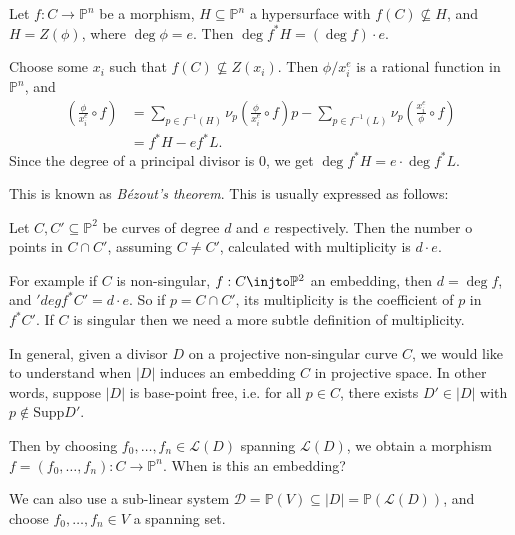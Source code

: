 \documentclass[12pt]{article}
\begin{document}
\begin{theorem}
	Let $f : C \to \mathbb{P}^n$ be a morphism, $H \subseteq \mathbb{P}^n$ a hypersurface with $f(C) \not \subseteq H$, and $H = Z(\phi)$, where $\deg \phi = e$. Then $\deg f^\ast H = (\deg f) \cdot e$.
\end{theorem}

\begin{proofbox}
	Choose some $x_i$ such that $f(C) \not \subseteq Z(x_i)$. Then $\phi/x_i^e$ is a rational function in $\mathbb{P}^n$, and
	\begin{align*}
		\left( \frac{\phi}{x_i^e} \circ f\right) &= \sum_{p \in f^{-1}(H)} \nu_p \left( \frac{\phi}{x_i^e} \circ f \right) p - \sum_{ p \in f^{-1}(L)} \nu_p \left( \frac{x_i^e}{\phi} \circ f \right) \\
							 &= f^\ast H - e f^\ast L.
	\end{align*}
	Since the degree of a principal divisor is $0$, we get $\deg f^\ast H = e \cdot \deg f^\ast L$.
\end{proofbox}


\begin{remark}
	This is known as \emph{B\'ezout's theorem}. This is usually expressed as follows:

	Let $C, C' \subseteq \mathbb{P}^2$ be curves of degree $d$ and $e$ respectively. Then the number o points in $C \cap C'$, assuming $C \neq C'$, calculated with multiplicity is $d \cdot e$.
\end{remark}

For example if $C$ is non-singular, $f : C \injto \mathbb{P}^2$ an embedding, then $d = \deg f$, and $'deg f^\ast C' = d \cdot e$. So if $p = C \cap C'$, its multiplicity is the coefficient of $p$ in $f^\ast C'$. If $C$ is singular then we need a more subtle definition of multiplicity.

In general, given a divisor $D$ on a projective non-singular curve $C$, we would like to understand when $|D|$ induces an embedding $C$ in projective space. In other words, suppose $|D|$ is base-point free, i.e. for all $p \in C$, there exists $D' \in |D|$ with $p \not \in \mathrm{Supp}D'$.

Then by choosing $f_0, \ldots, f_n \in \mathcal{L}(D)$ spanning $\mathcal{L}(D)$, we obtain a morphism $f = (f_0, \ldots, f_n) : C \to \mathbb{P}^n$. When is this an embedding?

We can also use a sub-linear system $\mathcal{D} = \mathbb{P}(V) \subseteq |D| = \mathbb{P}(\mathcal{L}(D))$, and choose $f_0, \ldots, f_n \in V$ a spanning set.
\end{document}

